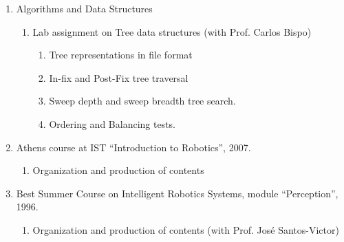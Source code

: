 \documentclass[
]{article}
\begin{document}
\begin{enumerate}
  \begin{enumerate}
  \def\labelenumii{\alph{enumii}.}
  \item
    Lab assignment of ``Cell Automation for Quality Control'' (with
    Prof. Paulo Oliveira):

    \begin{enumerate}
    \def\labelenumiii{\roman{enumiii}.}
    \item
      Assembly of a Cell composed of Conveyor Belts (3), Robot
      Manipulators (2), proximity and defect sensors (5), push actuators
      (2).
    \item
      Modeling and Analysis of the Cell using Discrete Event Systems
    \item
      Trajectory Programming for a Robotic Manipulator
    \item
      Cell programming in GRAFCET using a PLC's
    \end{enumerate}
  \end{enumerate}
\item
  Algorithms and Data Structures

  \begin{enumerate}
  \def\labelenumii{\alph{enumii}.}
  \item
    Lab assignment on Tree data structures (with Prof. Carlos Bispo)

    \begin{enumerate}
    \def\labelenumiii{\roman{enumiii}.}
    \item
      Tree representations in file format
    \item
      In-fix and Post-Fix tree traversal
    \item
      Sweep depth and sweep breadth tree search.
    \item
      Ordering and Balancing tests.
    \end{enumerate}
  \end{enumerate}
\item
  Athens course at IST ``Introduction to Robotics'', 2007.

  \begin{enumerate}
  \def\labelenumii{\alph{enumii}.}
  \item
    Organization and production of contents
  \end{enumerate}
\item
  Best Summer Course on Intelligent Robotics Systems, module
  ``Perception'', 1996.

  \begin{enumerate}
  \def\labelenumii{\alph{enumii}.}
  \item
    Organization and production of contents (with Prof. José
    Santos-Victor)
  \end{enumerate}
\end{enumerate}
\end{document}
